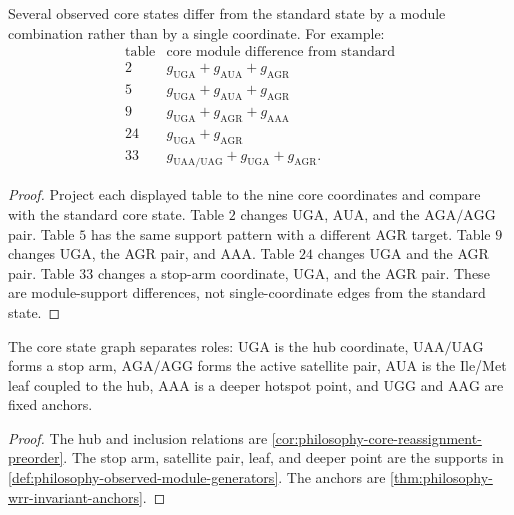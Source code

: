 
\begin{theorem}
\label{thm:philosophy-module-generators-explain-separation}
Several observed core states differ from the standard state by a module
combination rather than by a single coordinate. For example:
$$
\begin{array}{c|l}
  \text{table} & \text{core module difference from standard}\\
\hline
  2 & g_{\mathrm{UGA}}+g_{\mathrm{AUA}}+g_{\mathrm{AGR}}\\
  5 & g_{\mathrm{UGA}}+g_{\mathrm{AUA}}+g_{\mathrm{AGR}}\\
  9 & g_{\mathrm{UGA}}+g_{\mathrm{AGR}}+g_{\mathrm{AAA}}\\
  24 & g_{\mathrm{UGA}}+g_{\mathrm{AGR}}\\
  33 & g_{\mathrm{UAA/UAG}}+g_{\mathrm{UGA}}+g_{\mathrm{AGR}}.
\end{array}
$$
\end{theorem}
\begin{proof}
Project each displayed table to the nine core coordinates and compare
with the standard core state. Table $2$ changes $\mathrm{UGA}$,
$\mathrm{AUA}$, and the $\mathrm{AGA}/\mathrm{AGG}$ pair. Table $5$
has the same support pattern with a different AGR target. Table $9$
changes $\mathrm{UGA}$, the AGR pair, and $\mathrm{AAA}$. Table $24$
changes $\mathrm{UGA}$ and the AGR pair. Table $33$ changes a stop-arm
coordinate, $\mathrm{UGA}$, and the AGR pair. These are module-support
differences, not single-coordinate edges from the standard state.
\end{proof}

\begin{corollary}
\label{cor:philosophy-core-dynamics-roles}
The core state graph separates roles: $\mathrm{UGA}$ is the hub
coordinate, $\mathrm{UAA}/\mathrm{UAG}$ forms a stop arm,
$\mathrm{AGA}/\mathrm{AGG}$ forms the active satellite pair,
$\mathrm{AUA}$ is the Ile/Met leaf coupled to the hub, $\mathrm{AAA}$ is
a deeper hotspot point, and $\mathrm{UGG}$ and $\mathrm{AAG}$ are fixed
anchors.
\end{corollary}
\begin{proof}
The hub and inclusion relations are
\autoref{cor:philosophy-core-reassignment-preorder}. The stop arm,
satellite pair, leaf, and deeper point are the supports in
\autoref{def:philosophy-observed-module-generators}. The anchors are
\autoref{thm:philosophy-wrr-invariant-anchors}.
\end{proof}

